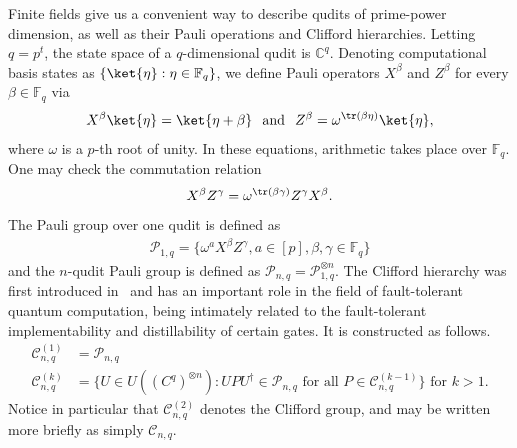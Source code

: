 \documentclass[11pt]{article}
\theoremstyle{definition}
\newcommand{\cC}{\mathcal{C}}
\newcommand{\cP}{\mathcal{P}}
\newcommand{\CC}{\mathbb{C}}
\newcommand{\FF}{\mathbb{F}}
\begin{document}
Finite fields give us a convenient way to describe qudits of prime-power dimension, as well as their Pauli operations and Clifford hierarchies. Letting $q=p^t$, the state space of a $q$-dimensional qudit is $\CC^q$. Denoting computational basis states as $\{\ket{\eta}:\eta \in \mathbb{F}_q\}$,
we define Pauli operators $X^\beta$ and $Z^\beta$ for every $\beta \in \mathbb{F}_q$ via
\begin{align}
    X^\beta \ket{\eta} = \ket{\eta + \beta} \hspace{.1in} \mbox{and} \hspace{.1in} Z^\beta = \omega^{\tr(\beta\eta)}\ket{\eta},
\end{align}
where $\omega$ is a $p$-th root of unity. In these equations, arithmetic takes place over $\FF_q$. One may check the commutation relation
\begin{equation}
    X^\beta Z^\gamma = \omega^{\tr(\beta\gamma)} Z^\gamma X^\beta.
\end{equation} 
The Pauli group over one qudit is defined as 
\begin{align}
    \cP_{1,q} = \{\omega^a X^\beta Z^\gamma, a\in [p], \beta,\gamma\in\FF_q\}
\end{align}
and the $n$-qudit Pauli group is defined as $\cP_{n,q} = \cP_{1,q}^{\otimes n}$. The Clifford hierarchy was first introduced in~\cite{gottesman1999demonstrating} and has an important role in the field of fault-tolerant quantum computation, being intimately related to the fault-tolerant implementability and distillability of certain gates. It is constructed as follows.
\begin{align}
    \mathcal{C}_{n,q}^{(1)} &= \mathcal{P}_{n,q}\\
    \cC_{n,q}^{(k)} &= \{U\in U((C^q)^{\otimes n}): UPU^{\dagger}\in \cP_{n,q} \text{ for all } P\in \mathcal{C}_{n,q}^{(k-1)}\}\text{ for }k > 1.
\end{align}
Notice in particular that $\mathcal{C}_{n,q}^{(2)}$ denotes the Clifford group, and may be written more briefly as simply $\mathcal{C}_{n,q}$.
\end{document}
